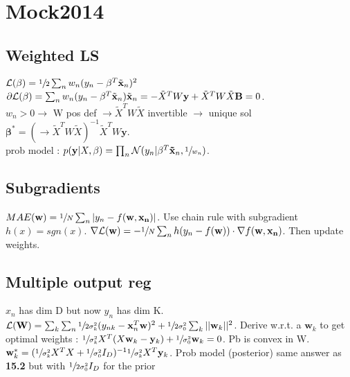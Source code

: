 \section{Mock2014}
\subsection{Weighted LS}
$\mathcal{L}(\mathbf{\beta}) = \sfrac{1}{2} \sum_{n}w_n (y_n - \mathbf{\beta}^T \tilde{\mathbf{x}}_n)^2$ \\

$\partial \mathcal{L}(\mathbf{\beta}) = \sum_n w_n(y_n - \mathbf{\beta}^T\tilde{\mathbf{x}}_n) \tilde{\mathbf{x}}_n \newline = -\tilde{X}^T W \mathbf{y} + \tilde{X}^T W \tilde{X} \mathbf{B} = 0$.\\

$w_n > 0 \rightarrow$ W pos def $\rightarrow \tilde{X}^T W \tilde{X}$ invertible $\rightarrow$ unique sol $\mathbf{\beta}^* = (\rightarrow \tilde{X}^T W \tilde{X})^{-1}\tilde{X}^T W \mathbf{y}$.\\
prob model : \newline $p(\mathbf{y} | X, \mathbf{\beta}) = \prod_n \mathcal{N}(y_n | \mathbf{\beta}^T \mathbf{\tilde{x}}_n, \sfrac{1}{w_n})$. 

\subsection{Subgradients}
$MAE(\mathbf{w}) = \sfrac{1}{N} \sum_n |y_n - f(\mathbf{w}, \mathbf{x_n})|$. Use chain rule with subgradient $h(x) = sgn(x)$. \newline $\nabla \mathcal{L}(\mathbf{w}) = - \sfrac{1}{N} \sum_n h(y_n - f(\mathbf{w})) \cdot \nabla f(\mathbf{w}, \mathbf{x_n})$. Then update weights.

\subsection{Multiple output reg}
$x_n$ has dim D but now $y_n$ has dim K. 
$\mathcal{L}(\mathbf{W}) = \sum_k \sum_n \sfrac{1}{2 \sigma^2_k}(y_{nk} -\mathbf{x}^T_n \mathbf{w})^2 + \sfrac{1}{2 \sigma_0^2}\sum_k ||\mathbf{w}_k||^2$. Derive w.r.t. a $\mathbf{w}_k$ to get optimal weights : $\sfrac{1}{ \sigma^2_k} X^T(X \mathbf{w}_k - \mathbf{y}_k) + \sfrac{1}{\sigma_0^2} \mathbf{w}_k = 0$. Pb is convex in W. $\mathbf{w}^*_k = (\sfrac{1}{ \sigma^2_k} X^T X + \sfrac{1}{\sigma_0^2} I_D)^{-1} \sfrac{1}{\sigma^2_k} X^T \mathbf{y}_k$. 
Prob model (posterior) same answer as \textbf{15.2} but with $\sfrac{1}{2 \sigma_0^2} I_D$ for the prior

